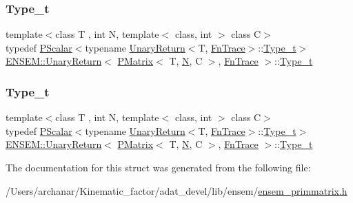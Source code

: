 \subsubsection{\texorpdfstring{Type\_t}{Type\_t}\hspace{0.1cm}{\footnotesize\ttfamily [1/2]}}
{\footnotesize\ttfamily template$<$class T , int N, template$<$ class, int $>$ class C$>$ \\
typedef \mbox{\hyperlink{classENSEM_1_1PScalar}{P\+Scalar}}$<$typename \mbox{\hyperlink{structENSEM_1_1UnaryReturn}{Unary\+Return}}$<$T, \mbox{\hyperlink{structENSEM_1_1FnTrace}{Fn\+Trace}}$>$\+::\mbox{\hyperlink{structENSEM_1_1UnaryReturn_3_01PMatrix_3_01T_00_01N_00_01C_01_4_00_01FnTrace_01_4_a8ec6f07f0fe243d3d023ab02325eaa05}{Type\+\_\+t}}$>$ \mbox{\hyperlink{structENSEM_1_1UnaryReturn}{E\+N\+S\+E\+M\+::\+Unary\+Return}}$<$ \mbox{\hyperlink{classENSEM_1_1PMatrix}{P\+Matrix}}$<$ T, \mbox{\hyperlink{operator__name__util_8cc_a7722c8ecbb62d99aee7ce68b1752f337}{N}}, C $>$, \mbox{\hyperlink{structENSEM_1_1FnTrace}{Fn\+Trace}} $>$\+::\mbox{\hyperlink{structENSEM_1_1UnaryReturn_3_01PMatrix_3_01T_00_01N_00_01C_01_4_00_01FnTrace_01_4_a8ec6f07f0fe243d3d023ab02325eaa05}{Type\+\_\+t}}}

\mbox{\label{structENSEM_1_1UnaryReturn_3_01PMatrix_3_01T_00_01N_00_01C_01_4_00_01FnTrace_01_4_a8ec6f07f0fe243d3d023ab02325eaa05}} 
\subsubsection{\texorpdfstring{Type\_t}{Type\_t}\hspace{0.1cm}{\footnotesize\ttfamily [2/2]}}
{\footnotesize\ttfamily template$<$class T , int N, template$<$ class, int $>$ class C$>$ \\
typedef \mbox{\hyperlink{classENSEM_1_1PScalar}{P\+Scalar}}$<$typename \mbox{\hyperlink{structENSEM_1_1UnaryReturn}{Unary\+Return}}$<$T, \mbox{\hyperlink{structENSEM_1_1FnTrace}{Fn\+Trace}}$>$\+::\mbox{\hyperlink{structENSEM_1_1UnaryReturn_3_01PMatrix_3_01T_00_01N_00_01C_01_4_00_01FnTrace_01_4_a8ec6f07f0fe243d3d023ab02325eaa05}{Type\+\_\+t}}$>$ \mbox{\hyperlink{structENSEM_1_1UnaryReturn}{E\+N\+S\+E\+M\+::\+Unary\+Return}}$<$ \mbox{\hyperlink{classENSEM_1_1PMatrix}{P\+Matrix}}$<$ T, \mbox{\hyperlink{operator__name__util_8cc_a7722c8ecbb62d99aee7ce68b1752f337}{N}}, C $>$, \mbox{\hyperlink{structENSEM_1_1FnTrace}{Fn\+Trace}} $>$\+::\mbox{\hyperlink{structENSEM_1_1UnaryReturn_3_01PMatrix_3_01T_00_01N_00_01C_01_4_00_01FnTrace_01_4_a8ec6f07f0fe243d3d023ab02325eaa05}{Type\+\_\+t}}}



The documentation for this struct was generated from the following file\+:\begin{DoxyCompactItemize}
\item 
/\+Users/archanar/\+Kinematic\+\_\+factor/adat\+\_\+devel/lib/ensem/\mbox{\hyperlink{lib_2ensem_2ensem__primmatrix_8h}{ensem\+\_\+primmatrix.\+h}}\end{DoxyCompactItemize}
